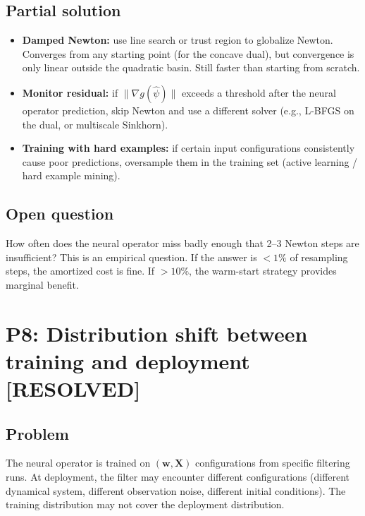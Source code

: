 \documentclass[11pt]{article}
\newcommand{\bw}{\mathbf{w}}
\newcommand{\bX}{\mathbf{X}}
\newcommand{\statusresolved}{\textcolor{resolved}{\textbf{[RESOLVED]}}}
\begin{document}
\subsection*{Partial solution}
\begin{itemize}[nosep,leftmargin=1.5em]
    \item \textbf{Damped Newton:} use line search or trust region to globalize Newton. Converges from any starting point (for the concave dual), but convergence is only linear outside the quadratic basin. Still faster than starting from scratch.
    \item \textbf{Monitor residual:} if $\|\nabla g(\hat\psi)\|$ exceeds a threshold after the neural operator prediction, skip Newton and use a different solver (e.g., L-BFGS on the dual, or multiscale Sinkhorn).
    \item \textbf{Training with hard examples:} if certain input configurations consistently cause poor predictions, oversample them in the training set (active learning / hard example mining).
\end{itemize}

\subsection*{Open question}
How often does the neural operator miss badly enough that 2--3 Newton steps are insufficient? This is an empirical question. If the answer is $<1\%$ of resampling steps, the amortized cost is fine. If $>10\%$, the warm-start strategy provides marginal benefit.

\section{P8: Distribution shift between training and deployment \statusresolved}

\subsection*{Problem}
The neural operator is trained on $(\bw, \bX)$ configurations from specific filtering runs. At deployment, the filter may encounter different configurations (different dynamical system, different observation noise, different initial conditions). The training distribution may not cover the deployment distribution.
\end{document}
